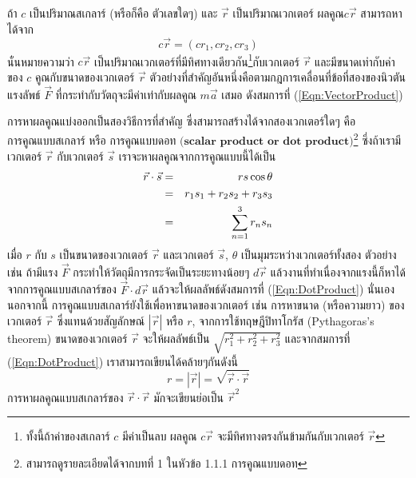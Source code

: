 ถ้า $c$ เป็นปริมาณสเกลาร์ (หรือก็คือ ตัวเลขใดๆ) และ $\vec{r}$ เป็นปริมาณเวกเตอร์ $\textit{ผลคูณ} c\vec{r}$ สามารถหาได้จาก
\begin{equation}\label{Eqn:VectorProduct}
c\vec{r} = (cr_1, cr_2, cr_3)
\end{equation}
นั่นหมายความว่า $c\vec{r}$ เป็นปริมาณเวกเตอร์ที่มีทิศทางเดียวกัน\footnote{ทั้งนี้ถ้าค่าของสเกลาร์ $c$ มีค่าเป็นลบ ผลคูณ $c\vec{r}$ จะมีทิศทาง$\textit{ตรงกันข้ามกัน}$กับเวกเตอร์ $\vec{r}$}กับเวกเตอร์ $\vec{r}$ และมีขนาดเท่ากับค่าของ $c$ คูณกับขนาดของเวกเตอร์ $\vec{r}$ ตัวอย่างที่สำคัญอันหนึ่งคือตามกฎการเคลื่อนที่ข้อที่สองของนิวตัน แรงลัพธ์ $\vec{F}$ ที่กระทำกับวัตถุจะมีค่าเท่ากับผลคูณ $m\vec{a}$ เสมอ ดังสมการที่ (\ref{Eqn:VectorProduct})

การหาผลคูณแบ่งออกเป็นสองวิธีการที่สำคัญ ซึ่งสามารถสร้างได้จากสองเวกเตอร์ใดๆ คือ $\textbf{การคูณแบบสเกลาร์ หรือ การคูณแบบดอท (scalar product or dot product)}$\footnote{สามารถดูรายละเอียดได้จากบทที่ 1 ในหัวข้อ 1.1.1 การคูณแบบดอท} ซึ่งถ้าเรามีเวกเตอร์ $\vec{r}$ กับเวกเตอร์ $\vec{s}$ เราจะหาผลคูณจากการคูณแบบนี้ได้เป็น
\begin{eqnarray}\label{Eqn:DotProduct}
\vec{r}\cdot\vec{s} &=& rs \cos{\theta} \nonumber \\
		&=& r_1s_1 + r_2s_2 + r_3s_3 \nonumber \\
		&=& \sum_{n = 1}^{3} r_ns_n
\end{eqnarray}
เมื่อ $r$ กับ $s$ เป็นขนาดของเวกเตอร์ $\vec{r}$ และเวกเตอร์ $\vec{s}$, $\theta$ เป็นมุมระหว่างเวกเตอร์ทั้งสอง ตัวอย่างเช่น ถ้ามีแรง $\vec{F}$ กระทำให้วัตถุมีการกระจัดเป็นระยะทางน้อยๆ $d\vec{r}$ แล้วงานที่ทำเนื่องจากแรงนี้ก็หาได้จากการคูณแบบสเกลาร์ของ $\vec{F}\cdot d\vec{r}$ แล้วจะให้ผลลัพธ์ดังสมการที่ (\ref{Eqn:DotProduct}) นั่นเอง นอกจากนี้ การคูณแบบสเกลาร์ยังใช้เพื่อหาขนาดของเวกเตอร์ เช่น การหาขนาด (หรือความยาว) ของเวกเตอร์ $\vec{r}$ ซึ่งแทนด้วยสัญลักษณ์ $|\vec{r}|$ หรือ $r$, จากการใช้ทฤษฎีปิทาโกรัส (Pythagoras's theorem) ขนาดของเวกเตอร์ $\vec{r}$ จะให้ผลลัพธ์เป็น $\sqrt{r_1^2 + r_2^2 + r_3^2}$ และจากสมการที่ (\ref{Eqn:DotProduct}) เราสามารถเขียนได้คล้ายๆกันดังนี้
\begin{equation}\label{Eqn:MagVecR}
r = |\vec{r}| = \sqrt{\vec{r}\cdot\vec{r}}
\end{equation}
การหาผลคูณแบบสเกลาร์ของ $\vec{r}\cdot\vec{r}$ มักจะเขียนย่อเป็น $\vec{r}^2$

